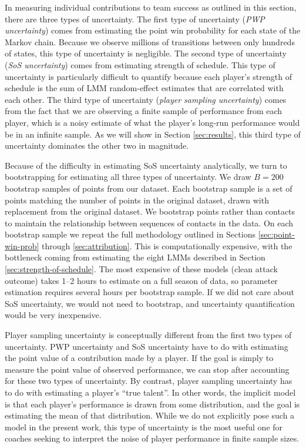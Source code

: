 \documentclass[USenglish]{article}
\theoremstyle{dgthm}
\theoremstyle{dgdef}
\begin{document}
In measuring individual contributions to team success as outlined in this section, there are three types of uncertainty. The first type of uncertainty ({\it PWP uncertainty}) comes from estimating the point win probability for each state of the Markov chain. Because we observe millions of transitions between only hundreds of states, this type of uncertainty is negligible. The second type of uncertainty ({\it SoS uncertainty}) comes from estimating strength of schedule. This type of uncertainty is particularly difficult to quantify because each player's strength of schedule is the sum of LMM random-effect estimates that are correlated with each other. The third type of uncertainty ({\it player sampling uncertainty}) comes from the fact that we are observing a finite sample of performance from each player, which is a noisy estimate of what the player's long-run performance would be in an infinite sample. As we will show in Section \ref{sec:results}, this third type of uncertainty dominates the other two in magnitude.

Because of the difficulty in estimating SoS uncertainty analytically, we turn to bootstrapping for estimating all three types of uncertainty. We draw $B = 200$ bootstrap samples of points from our dataset. Each bootstrap sample is a set of points matching the number of points in the original dataset, drawn with replacement from the original dataset. We bootstrap points rather than contacts to maintain the relationship between sequences of contacts in the data. On each bootstrap sample we repeat the full methodology outlined in Sections \ref{sec:point-win-prob} through \ref{sec:attribution}. This is computationally expensive, with the bottleneck coming from estimating the eight LMMs described in Section \ref{sec:strength-of-schedule}. The most expensive of these models (clean attack outcome) takes 1–2 hours to estimate on a full season of data, so parameter estimation requires several hours per bootstrap sample. If we did not care about SoS uncertainty, we would not need to bootstrap, and uncertainty quantification would be very inexpensive.

Player sampling uncertainty is conceptually different from the first two types of uncertainty. PWP uncertainty and SoS uncertainty have to do with estimating the point value of a contribution made by a player. If the goal is simply to measure the point value of observed performance, we can stop after accounting for these two types of uncertainty. By contrast, player sampling uncertainty has to do with estimating a player's ``true talent''. In other words, the implicit model is that each player's performance is drawn from some distribution, and the goal is estimating the mean of that distribution. While we do not explicitly pose such a model in the present work, this type of uncertainty is the most useful one for coaches seeking to interpret the noise of player performance in finite sample sizes.
\end{document}
